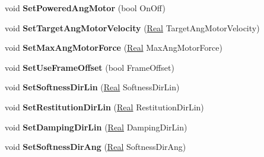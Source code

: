 \begin{DoxyCompactItemize}
\item 
\hypertarget{classphys_1_1SliderConstraint_aafa81adee5bc78b4d435429e9ddcf538}{
void {\bfseries SetPoweredAngMotor} (bool OnOff)}
\label{dc/d72/classphys_1_1SliderConstraint_aafa81adee5bc78b4d435429e9ddcf538}

\item 
\hypertarget{classphys_1_1SliderConstraint_acad0aa3e9b3086956e45c5825570ec10}{
void {\bfseries SetTargetAngMotorVelocity} (\hyperlink{namespacephys_af7eb897198d265b8e868f45240230d5f}{Real} TargetAngMotorVelocity)}
\label{dc/d72/classphys_1_1SliderConstraint_acad0aa3e9b3086956e45c5825570ec10}

\item 
\hypertarget{classphys_1_1SliderConstraint_a2fec0b1834acb78f0a7c2276ff14a991}{
void {\bfseries SetMaxAngMotorForce} (\hyperlink{namespacephys_af7eb897198d265b8e868f45240230d5f}{Real} MaxAngMotorForce)}
\label{dc/d72/classphys_1_1SliderConstraint_a2fec0b1834acb78f0a7c2276ff14a991}

\item 
\hypertarget{classphys_1_1SliderConstraint_ac6800dd5abfe2fd90948967b08398022}{
void {\bfseries SetUseFrameOffset} (bool FrameOffset)}
\label{dc/d72/classphys_1_1SliderConstraint_ac6800dd5abfe2fd90948967b08398022}

\item 
\hypertarget{classphys_1_1SliderConstraint_a96bccd70fb876ee279c942fdd0d14997}{
void {\bfseries SetSoftnessDirLin} (\hyperlink{namespacephys_af7eb897198d265b8e868f45240230d5f}{Real} SoftnessDirLin)}
\label{dc/d72/classphys_1_1SliderConstraint_a96bccd70fb876ee279c942fdd0d14997}

\item 
\hypertarget{classphys_1_1SliderConstraint_ad8fbde22dea580bcbee816d9e1426c14}{
void {\bfseries SetRestitutionDirLin} (\hyperlink{namespacephys_af7eb897198d265b8e868f45240230d5f}{Real} RestitutionDirLin)}
\label{dc/d72/classphys_1_1SliderConstraint_ad8fbde22dea580bcbee816d9e1426c14}

\item 
\hypertarget{classphys_1_1SliderConstraint_aa34acb7592f0de36205919dc82f996e1}{
void {\bfseries SetDampingDirLin} (\hyperlink{namespacephys_af7eb897198d265b8e868f45240230d5f}{Real} DampingDirLin)}
\label{dc/d72/classphys_1_1SliderConstraint_aa34acb7592f0de36205919dc82f996e1}

\item 
\hypertarget{classphys_1_1SliderConstraint_a27e0e6cbad5cb7366dab889a9fda5d0b}{
void {\bfseries SetSoftnessDirAng} (\hyperlink{namespacephys_af7eb897198d265b8e868f45240230d5f}{Real} SoftnessDirAng)}
\label{dc/d72/classphys_1_1SliderConstraint_a27e0e6cbad5cb7366dab889a9fda5d0b}


\end{DoxyCompactItemize}
